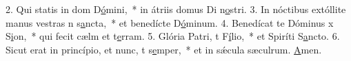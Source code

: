 2. Qui statis in dom D\uline{ó}mini,~* in átriis domus Di n\uline{o}stri.
3. In nóctibus extóllite manus vestras n s\uline{a}ncta,~* et benedícte D\uline{ó}minum.
4. Benedícat te Dóminus x S\uline{i}on,~* qui fecit cælm et t\uline{e}rram.
5. Glória Patri, t F\uline{í}lio,~* et Spiríti S\uline{a}ncto.
6. Sicut erat in princípio, et nunc, t s\uline{e}mper,~* et in sǽcula sæculrum. \uline{A}men.

